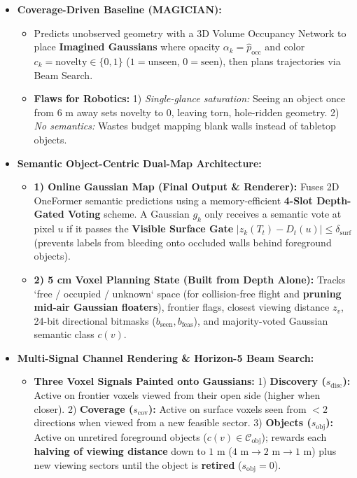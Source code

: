 \documentclass[10pt, a4paper]{article}
\begin{document}
\begin{itemize}
    \item \textbf{Coverage-Driven Baseline (MAGICIAN):}
    \begin{itemize}
        \item Predicts unobserved geometry with a 3D Volume Occupancy Network to place \textbf{Imagined Gaussians} where opacity $\alpha_k = \hat{p}_{\text{occ}}$ and color $c_k = \text{novelty} \in \{0,1\}$ ($1=\text{unseen}$, $0=\text{seen}$), then plans trajectories via Beam Search.
        \item \textbf{Flaws for Robotics:} 1) \emph{Single-glance saturation:} Seeing an object once from $6\text{ m}$ away sets novelty to $0$, leaving torn, hole-ridden geometry. 2) \emph{No semantics:} Wastes budget mapping blank walls instead of tabletop objects.
    \end{itemize}
    \item \textbf{Semantic Object-Centric Dual-Map Architecture:}
    \begin{itemize}
        \item \textbf{1) Online Gaussian Map (Final Output \& Renderer):} Fuses 2D OneFormer semantic predictions using a memory-efficient \textbf{4-Slot Depth-Gated Voting} scheme. A Gaussian $g_k$ only receives a semantic vote at pixel $u$ if it passes the \textbf{Visible Surface Gate} $|z_k(T_t) - D_t(u)| \le \delta_{\text{surf}}$ (prevents labels from bleeding onto occluded walls behind foreground objects).
        \item \textbf{2) 5 cm Voxel Planning State (Built from Depth Alone):} Tracks `free / occupied / unknown` space (for collision-free flight and \textbf{pruning mid-air Gaussian floaters}), frontier flags, closest viewing distance $z_v$, 24-bit directional bitmasks ($b_{\text{seen}}, b_{\text{feas}}$), and majority-voted Gaussian semantic class $c(v)$.
    \end{itemize}
    \item \textbf{Multi-Signal Channel Rendering \& Horizon-5 Beam Search:}
    \begin{itemize}
        \item \textbf{Three Voxel Signals Painted onto Gaussians:}
        1) \textbf{Discovery ($s_{\text{disc}}$):} Active on frontier voxels viewed from their open side (higher when closer).
        2) \textbf{Coverage ($s_{\text{cov}}$):} Active on surface voxels seen from $<2$ directions when viewed from a new feasible sector.
        3) \textbf{Objects ($s_{\text{obj}}$):} Active on unretired foreground objects ($c(v)\in\mathcal{C}_{\text{obj}}$); rewards each \textbf{halving of viewing distance} down to $1\text{ m}$ ($4\text{ m} \to 2\text{ m} \to 1\text{ m}$) plus new viewing sectors until the object is \textbf{retired} ($s_{\text{obj}}=0$).

\end{itemize}
\end{itemize}
\end{document}
